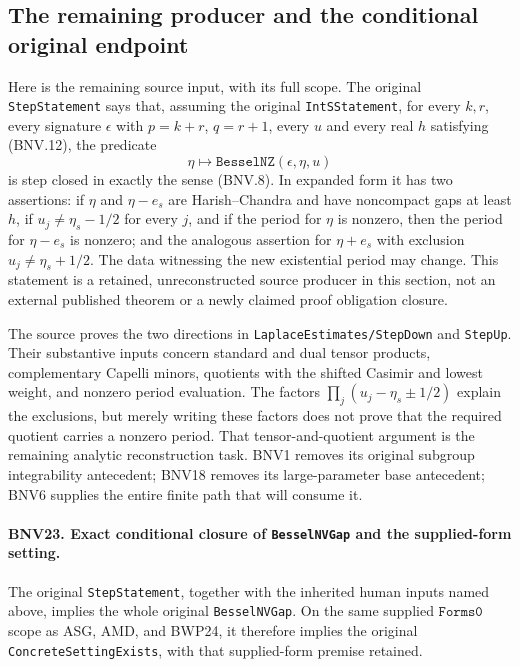 \subsection{The remaining producer and the conditional original endpoint}

Here is the remaining source input, with its full scope.  The original
\texttt{StepStatement} says that, assuming the original
\texttt{IntSStatement}, for every $k,r$, every signature $\epsilon$ with
$p=k+r$, $q=r+1$, every $u$ and every real $h$ satisfying (BNV.12),
the predicate
\[
 \eta\longmapsto\texttt{BesselNZ}(\epsilon,\eta,u)
 \tag{BNV.41}
\]
is step closed in exactly the sense (BNV.8).  In expanded form it has
two assertions: if $\eta$ and $\eta-e_s$ are Harish--Chandra and have
noncompact gaps at least $h$, if $u_j\ne\eta_s-1/2$ for every $j$, and
if the period for $\eta$ is nonzero, then the period for $\eta-e_s$ is
nonzero; and the analogous assertion for $\eta+e_s$ with exclusion
$u_j\ne\eta_s+1/2$.  The data witnessing the new existential period may
change.  This statement is a retained, unreconstructed source producer
in this section, not an external published theorem or a newly claimed
proof obligation closure.

The source proves the two directions in \texttt{LaplaceEstimates/StepDown}
and \texttt{StepUp}.  Their substantive inputs concern standard and dual
tensor products, complementary Capelli minors, quotients with the shifted
Casimir and lowest weight, and nonzero period evaluation.  The factors
$\prod_j(u_j-\eta_s\pm1/2)$ explain the exclusions, but merely writing
these factors does not prove that the required quotient carries a
nonzero period.  That tensor-and-quotient argument is the remaining
analytic reconstruction task.  BNV1 removes its original subgroup
integrability antecedent; BNV18 removes its large-parameter base
antecedent; BNV6 supplies the entire finite path that will consume it.

\paragraph{BNV23. Exact conditional closure of \texttt{BesselNVGap} and the supplied-form setting.}
\label{claim:BNV23}
The original \texttt{StepStatement}, together with the inherited human
inputs named above, implies the whole original \texttt{BesselNVGap}.
On the same supplied $\texttt{Forms0}$ scope as ASG, AMD, and BWP24, it
therefore implies the original \texttt{ConcreteSettingExists}, with
that supplied-form premise retained.

